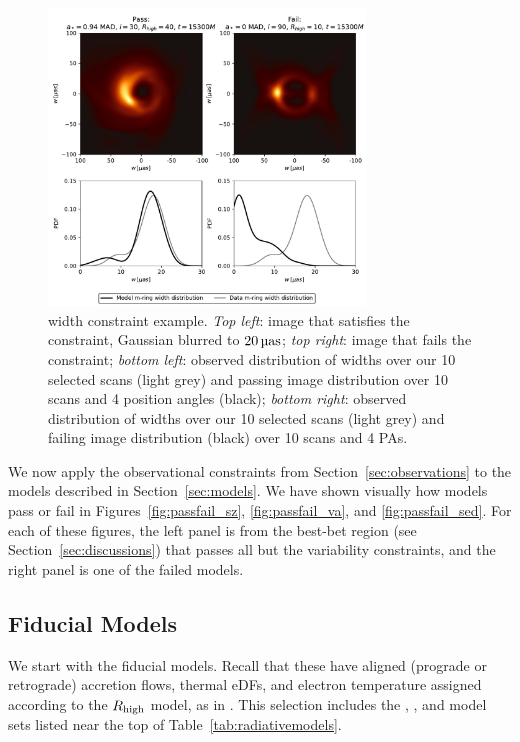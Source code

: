 \begin{figure}
  \centering
  \includegraphics[width=0.75\textwidth]{figures/mring_width_example.pdf}
  \caption{\Mring width constraint example.
    \emph{Top left}: image that satisfies the constraint, Gaussian blurred to $20\uas$;
    \emph{top right}: image that fails the constraint;
    \emph{bottom left}: observed distribution of \mring widths over our 10 selected scans (light grey) and passing image distribution over 10 scans and 4 position angles (black);
    \emph{bottom right}: observed distribution of \mring widths over our 10 selected scans (light grey) and failing image distribution (black) over 10 scans and 4 PAs.}
  \label{fig:mring_width_example}
\end{figure}

We now apply the observational constraints from Section~\ref{sec:observations} to the models described in Section~\ref{sec:models}.
We have shown visually how models pass or fail in Figures~\ref{fig:passfail_sz}, \ref{fig:passfail_va}, and \ref{fig:passfail_sed}.
For each of these figures, the left panel is from the best-bet region (see Section~\ref{sec:discussions}) that passes all but the variability constraints, and the right panel is one of the failed models.

\subsection{Fiducial Models}\label{subsec:thermal}

We start with the fiducial models.
Recall that these have aligned (prograde or retrograde) accretion flows, thermal eDFs, and electron temperature assigned according to the $R_\mathrm{high}$ model, as in .
This selection includes the \kharma, \bhac, and \hamr model sets listed near the top of Table~\ref{tab:radiativemodels}.

